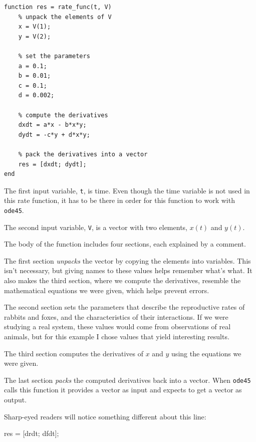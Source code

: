 \begin{lstlisting}[caption={A rate function for Lotka-Volterra}, label={lst:lotka_volterra}]
function res = rate_func(t, V)
    % unpack the elements of V
    x = V(1);
    y = V(2);

    % set the parameters
    a = 0.1;
    b = 0.01;
    c = 0.1;
    d = 0.002;

    % compute the derivatives
    dxdt = a*x - b*x*y;
    dydt = -c*y + d*x*y;

    % pack the derivatives into a vector
    res = [dxdt; dydt];
end
\end{lstlisting}

The first input variable, \lstinline{t}, is time.
Even though the time variable is not used in this rate function,
it has to be there in order for this function to work with \lstinline{ode45}.

The second input variable, \lstinline{V}, is a vector with two elements,
$x(t)$ and $y(t)$.

The body of the function includes four sections, each explained by a comment.

The first section {\em unpacks} the vector by copying the elements
into variables.  This isn't necessary, but giving names to
these values helps remember what's what.  It also makes the third
section, where we compute the derivatives, resemble the mathematical
equations we were given, which helps prevent errors.


The second section sets the parameters that describe the
reproductive rates of rabbits and foxes, and the characteristics of
their interactions.  If we were studying a real system, these values
would come from observations of real animals, but for this example
I chose values that yield interesting results.


The third section computes the derivatives of $x$ and $y$ using the equations
we were given.

The last section {\em packs} the computed derivatives back into a
vector.  When \lstinline{ode45} calls this function it provides a vector
as input and expects to get a vector as output.

Sharp-eyed readers will notice something different about this line:

\begin{code}
    res = [drdt; dfdt];
\end{code}


